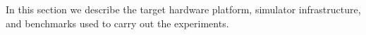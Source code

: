 
In this section we describe the target hardware platform, simulator infrastructure, and benchmarks used to carry out the experiments.



%    
%
%
%
%
%
%
